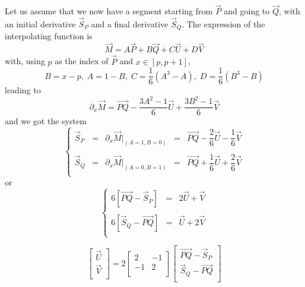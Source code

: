 \documentclass[aps,10pt]{revtex4}
\begin{document}
Let us assume that we now have a segment starting from $\vec{P}$ and going to $\vec{Q}$, with an initial derivative $\vec{S}_P$ and a final derivative $\vec{S}_Q$.
The expression of the interpolating function is
\begin{equation}
	\vec{M} = A \vec{P} + B \vec{Q} + C \vec{U} + D \vec{V}
\end{equation}
with, using $p$ as the index of $\vec{P}$ and $x\in[p,p+1]$,
\begin{equation}
	B = x-p,\; A=1-B,\; C = \frac{1}{6}(A^3-A), \; D=\frac{1}{6}(B^3-B)
\end{equation}
leading to
\begin{equation}
	\partial_x \vec{M} = \overrightarrow{PQ} - \frac{3A^2-1}{6} \vec{U} + \frac{3B^2-1}{6} \vec{V}
\end{equation}
and we got the system
\begin{equation}
\left\lbrace
\begin{array}{rcrcl}
	\vec{S}_P & = & \partial_x\vec{M}|_{(A=1,B=0)} & = & \overrightarrow{PQ} - \dfrac{2}{6}\vec{U} - \dfrac{1}{6}\vec{V} \\
	\\
	\vec{S}_Q & = & \partial_x\vec{M}|_{(A=0,B=1)} & = & \overrightarrow{PQ} + \dfrac{1}{6}\vec{U} + \dfrac{2}{6}\vec{V} \\

\end{array}
\right.
\end{equation}
or
\begin{equation}
\left\lbrace
\begin{array}{rcl}
	6\left[\overrightarrow{PQ} - \vec{S}_P \right] & = & 2\vec{U} + \vec{V}\\
	\\
	6\left[\vec{S}_Q - \overrightarrow{PQ} \right] & = & \vec{U} + 2\vec{V}\\
	\end{array}
\right.
\end{equation}

\begin{equation}
	\begin{bmatrix}
	\vec{U}\\
	\vec{V}\\
	\end{bmatrix}
	= 2 
	\begin{bmatrix}
	2 & -1\\
	-1 & 2\\
	\end{bmatrix}
	\begin{bmatrix}
	 \overrightarrow{PQ} - \vec{S}_P  \\
	 \vec{S}_Q - \overrightarrow{PQ}  \\
	\end{bmatrix}
\end{equation}
\end{document}
